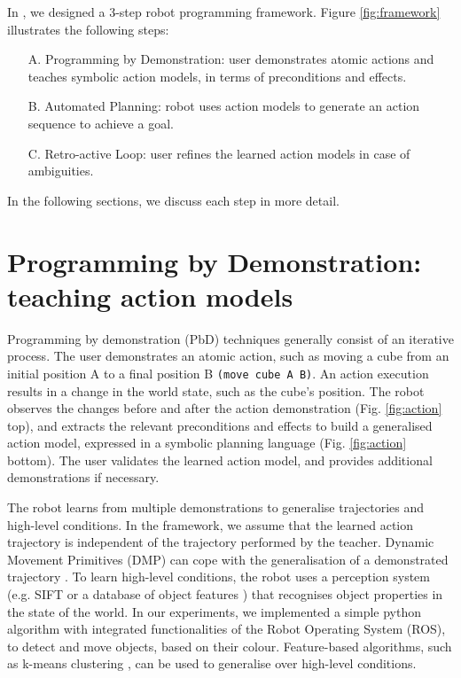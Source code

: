 In \cite{liang2017framework}, we designed a 3-step robot programming framework. Figure \ref{fig:framework} illustrates the following steps: 
\begin{enumerate}
	\item[A.]{Programming by Demonstration: user demonstrates atomic actions and teaches symbolic action models, in terms of preconditions and effects.}
	\item[B.]{Automated Planning: robot uses action models to generate an action sequence to achieve a goal.}
	\item[C.]{Retro-active Loop: user refines the learned action models in case of ambiguities.}
\end{enumerate}
In the following sections, we discuss each step in more detail. 

\section{Programming by Demonstration: teaching action models}
Programming by demonstration (PbD) techniques generally consist of an iterative process. The user demonstrates an atomic action, such as moving a cube from an initial position A to a final position B \texttt{(move cube A B)}. An action execution results in a change in the world state, such as the cube's position. The robot observes the changes before and after the action demonstration (Fig. \ref{fig:action} top), and extracts the relevant preconditions and effects to build a generalised action model, expressed in a symbolic planning language (Fig. \ref{fig:action} bottom). The user validates the learned action model, and provides additional demonstrations if necessary.

The robot learns from multiple demonstrations to generalise trajectories and high-level conditions. In the framework, we assume that the learned action trajectory is independent of the trajectory performed by the teacher. Dynamic Movement Primitives (DMP) can cope with the generalisation of a demonstrated trajectory \cite{pastor2009learning}. To learn high-level conditions, the robot uses a perception system (e.g. SIFT \cite{ahmadzadeh2015learning} or a database of object features \cite{mason2011robot}) that recognises object properties in the state of the world. 
In our experiments, we implemented a simple python algorithm with integrated functionalities of the Robot Operating System (ROS), to detect and move objects, based on their colour. 
Feature-based algorithms, such as k-means clustering \cite{mollard2015robot}, can be used to generalise over high-level conditions.

